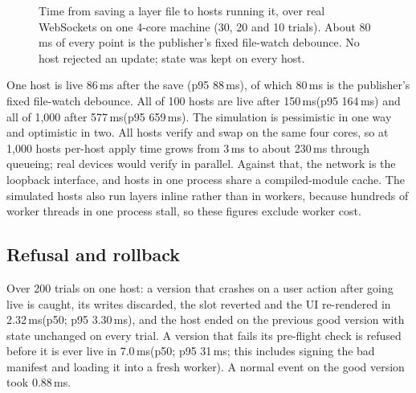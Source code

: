 \documentclass[10pt,twocolumn]{article}
\newcommand{\ms}{\,ms\xspace}
\begin{document}
\begin{figure}[t]
\centering
{}
\caption{Time from saving a layer file to hosts running it, over real WebSockets on one 4-core
machine (30, 20 and 10 trials). About 80\ms of every point is the publisher's fixed file-watch
debounce. No host rejected an update; state was kept on every host.}
\label{fig:fleet}
\end{figure}

One host is live 86\ms after the save (p95 88\ms), of which 80\ms is the publisher's fixed
file-watch debounce. All of 100 hosts are live after 150\ms (p95 164\ms) and all of 1{,}000 after
577\ms (p95 659\ms). The simulation is pessimistic in one way and optimistic in two. All hosts
verify and swap on the same four cores, so at 1{,}000 hosts per-host apply time grows from 3\ms
to about 230\ms through queueing; real devices would verify in parallel. Against that, the network
is the loopback interface, and hosts in one process share a compiled-module cache. The simulated
hosts also run layers inline rather than in workers, because hundreds of worker threads in one
process stall, so these figures exclude worker cost.

\subsection{Refusal and rollback}

Over 200 trials on one host: a version that crashes on a user action after going live is caught,
its writes discarded, the slot reverted and the UI re-rendered in 2.32\ms (p50; p95 3.30\ms), and
the host ended on the previous good version with state unchanged on every trial. A version that
fails its pre-flight check is refused before it is ever live in 7.0\ms (p50; p95 31\ms; this
includes signing the bad manifest and loading it into a fresh worker). A normal event on the good
version took 0.88\ms.
\end{document}
